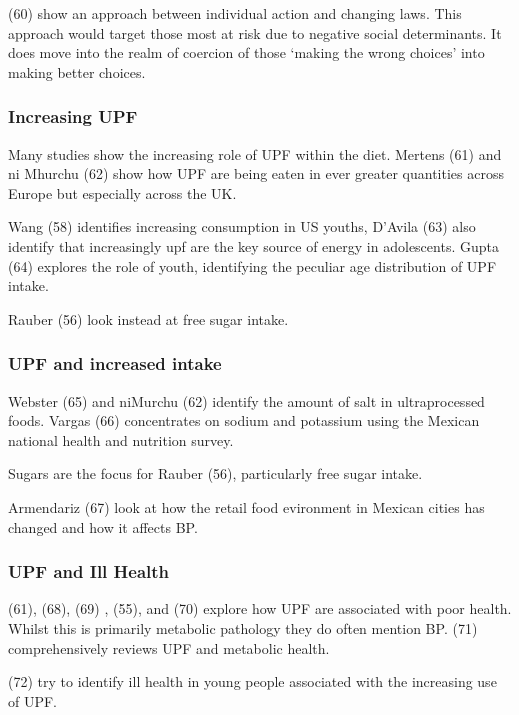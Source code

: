 \documentclass[
]{article}
\begin{document}
(60) show an approach between individual action and changing laws. This
approach would target those most at risk due to negative social
determinants. It does move into the realm of coercion of those `making
the wrong choices' into making better choices.

\hypertarget{increasing-upf}{%
\subsubsection{Increasing UPF}\label{increasing-upf}}

Many studies show the increasing role of UPF within the diet. Mertens
(61) and ni Mhurchu (62) show how UPF are being eaten in ever greater
quantities across Europe but especially across the UK.

Wang (58) identifies increasing consumption in US youths, D'Avila (63)
also identify that increasingly upf are the key source of energy in
adolescents. Gupta (64) explores the role of youth, identifying the
peculiar age distribution of UPF intake.

Rauber (56) look instead at free sugar intake.

\hypertarget{upf-and-increased-intake}{%
\subsubsection{UPF and increased
intake}\label{upf-and-increased-intake}}

Webster (65) and niMurchu (62) identify the amount of salt in
ultraprocessed foods. Vargas (66) concentrates on sodium and potassium
using the Mexican national health and nutrition survey.

Sugars are the focus for Rauber (56), particularly free sugar intake.

Armendariz (67) look at how the retail food evironment in Mexican cities
has changed and how it affects BP.

\hypertarget{upf-and-ill-health}{%
\subsubsection{UPF and Ill Health}\label{upf-and-ill-health}}

(61), (68), (69) , (55), and (70) explore how UPF are associated with
poor health. Whilst this is primarily metabolic pathology they do often
mention BP. (71) comprehensively reviews UPF and metabolic health.

(72) try to identify ill health in young people associated with the
increasing use of UPF.
\end{document}
